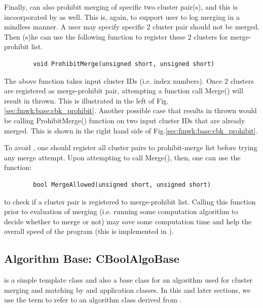 Finally, {\cmerge} can also prohibit merging of specific two cluster pair(s), and this is incoorporated by {\cbkeeper} as well.
This is, again, to support user to log merging in a mindless manner.
A user may specify specific 2 cluster pair should not be merged. 
Then (s)he can use the following function to register these 2 clusters for merge-prohibit list.
\begin{lstlisting}
        void ProhibitMerge(unsigned short, unsigned short)
\end{lstlisting}
The above function takes input cluster IDs (i.e. index numbers). 
Once 2 clusters are registered as merge-prohibit pair, attempting a function call {\ttfamily Merge()} will result in {\crue} thrown.
This is illustrated in the left of Fig.\ref{sec:fmwk:base:cbk_prohibit}.
Another possible case that results in {\crue} thrown would be calling {\ttfamily ProhibitMerge()} function on two input cluster IDs that are already merged. This is shown in the right hand side of Fig.\ref{sec:fmwk:base:cbk_prohibit}.

To avoid {\crue}, one should register all cluster pairs to prohibit-merge list before trying any merge attempt.
Upon attempting to call {\ttfamily Merge()}, then, one can use the function:
\begin{lstlisting}
        bool MergeAllowed(unsigned short, unsigned short)
\end{lstlisting}
to check if a cluster pair is registered to merge-prohibit list.
Calling this function prior to evaluation of merging (i.e. running some computation algorithm to decide whether to merge or not) may save some computation time and help the overall speed of the program (this is implemented in {\cmerge}).

\subsection{Algorithm Base: {\ttfamily CBoolAlgoBase}}
\label{sec:fmwk:base:cbalgo}
{\cbalgo} is a simple {\CPP} template class and also a base class for an algorithm used for cluster merging and matching by {\cmerge} and {\cmatch} application classes. In this and later sections, we use the term {\cmalgo} to refer to an algorithm class derived from {\cbalgo}.

